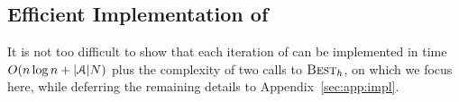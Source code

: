 \documentclass{article}
\begin{document}
\begin{algorithm}[t!]
\begin{algorithmic}[1]
       \label{step:conv:check:start}
       \label{step:L:bestL}
       \label{step:L:bestH}
       \label{step:conv:check:end}
\smallskip
{}
       \label{step:theta:update}
    \EndFor
\end{algorithmic}
\end{algorithm}

\subsection{Efficient Implementation of }
\label{sec:efficient}

It is not too difficult to show that each iteration of  can be implemented in time $O(n\log n+\lvert\mathcal{A}\rvert N)$ plus the complexity of two calls to $\textsc{\mdseries Best}_h$, on which we focus here, while deferring the remaining details to Appendix~\ref{sec:app:impl}.
\end{document}
